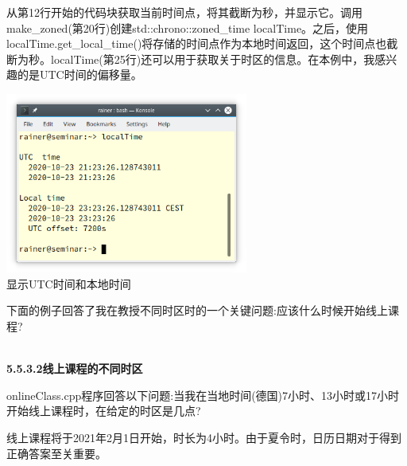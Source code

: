 从第12行开始的代码块获取当前时间点，将其截断为秒，并显示它。调用make\_zoned(第20行)创建std::chrono::zoned\_time localTime。之后，使用localTime.get\_local\_time()将存储的时间点作为本地时间返回，这个时间点也截断为秒。localTime(第25行)还可以用于获取关于时区的信息。在本例中，我感兴趣的是UTC时间的偏移量。

\begin{center}
\includegraphics[width=0.6\textwidth]{content/3/chapter5/images/27.png}\\
显示UTC时间和本地时间
\end{center}

下面的例子回答了我在教授不同时区时的一个关键问题:应该什么时候开始线上课程?

\hspace*{\fill} \\ %
\noindent
\textbf{5.5.3.2\hspace{0.2cm}线上课程的不同时区}

onlineClass.cpp程序回答以下问题:当我在当地时间(德国)7小时、13小时或17小时开始线上课程时，在给定的时区是几点?

线上课程将于2021年2月1日开始，时长为4小时。由于夏令时，日历日期对于得到正确答案至关重要。

